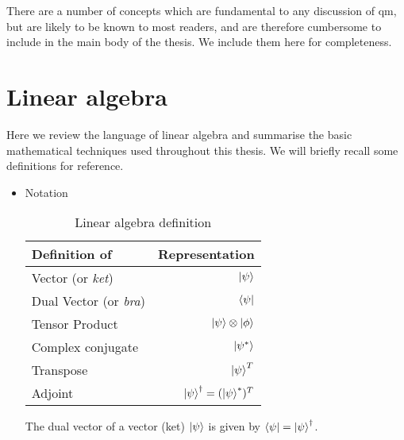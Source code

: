 There are a number of concepts which are fundamental to any discussion of \gls{qm}, 
    but are likely to be known to most readers, and are therefore cumbersome to include in the main body of the thesis. 
We include them here for completeness\footnotemark. 

\section{Linear algebra}
Here we review the language of linear algebra and summarise the basic mathematical techniques used throughout this thesis.
We will briefly recall some definitions for reference. 

\begin{itemize}
\item Notation

    \begin{table}[H]
        \centering
        \begin{tabular}{lr}
            \hline 
            Definition of & Representation \\
            \hline 
            Vector (or \textit{ket})     & $\ket{\psi} $  \\
            Dual Vector (or \textit{bra}) & $\bra{\psi}  $ \\
            Tensor Product & $\ket{\psi} \otimes \ket{\phi}$ \\
            Complex conjugate & $\ket{\psi^{*}}$ \\
            Transpose & $\ket{\psi}^T $\\
            Adjoint & $\ket{\psi}^{\dag}  = (\ket{\psi}^{*})^{T}$\\
            \hline 
        \end{tabular}
        \caption[Linear algebra defintions]{Linear algebra definition}
        \label{algebra}
    \end{table}
The dual vector of a vector (ket) $\ket{\psi} $ is given by $\bra{\psi} = \ket{\psi}^{\dag}$. 


\end{itemize}
